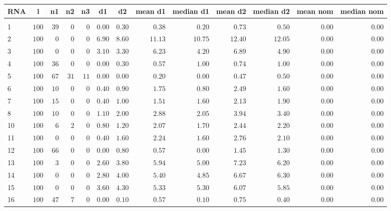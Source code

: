 \documentclass{article}
\begin{document}
\begin{landscape}
\begin{longtable}{lrrrrrrrrrrrr}
\hline\hline
\multicolumn{1}{c}{RNA}&\multicolumn{1}{c}{l}&\multicolumn{1}{c}{n1}&\multicolumn{1}{c}{n2}&\multicolumn{1}{c}{n3}&\multicolumn{1}{c}{d1}&\multicolumn{1}{c}{d2}&\multicolumn{1}{c}{mean d1}&\multicolumn{1}{c}{median d1}&\multicolumn{1}{c}{mean d2}&\multicolumn{1}{c}{median d2}&\multicolumn{1}{c}{mean nom}&\multicolumn{1}{c}{median nom}\\
\hline
&&&&&&&&&&&&\\
1&$100$&$39$&$ 0$&$ 0$&$0.00$&$0.30$&$ 0.38$&$ 0.20$&$ 0.73$&$ 0.50$&$0.00$&$0.00$\\
2&$100$&$ 0$&$ 0$&$ 0$&$6.90$&$8.60$&$11.13$&$10.75$&$12.40$&$12.05$&$0.00$&$0.00$\\
3&$100$&$ 0$&$ 0$&$ 0$&$3.10$&$3.30$&$ 6.23$&$ 4.20$&$ 6.89$&$ 4.90$&$0.00$&$0.00$\\
4&$100$&$36$&$ 0$&$ 0$&$0.00$&$0.30$&$ 0.57$&$ 1.00$&$ 0.74$&$ 1.00$&$0.00$&$0.00$\\
5&$100$&$67$&$31$&$11$&$0.00$&$0.00$&$ 0.20$&$ 0.00$&$ 0.47$&$ 0.50$&$0.00$&$0.00$\\
6&$100$&$10$&$ 0$&$ 0$&$0.40$&$0.90$&$ 1.75$&$ 0.80$&$ 2.49$&$ 1.60$&$0.00$&$0.00$\\
7&$100$&$15$&$ 0$&$ 0$&$0.40$&$1.00$&$ 1.51$&$ 1.60$&$ 2.13$&$ 1.90$&$0.00$&$0.00$\\
8&$100$&$10$&$ 0$&$ 0$&$1.10$&$2.00$&$ 2.88$&$ 2.05$&$ 3.94$&$ 3.40$&$0.00$&$0.00$\\
10&$100$&$ 6$&$ 2$&$ 0$&$0.80$&$1.20$&$ 2.07$&$ 1.70$&$ 2.44$&$ 2.20$&$0.00$&$0.00$\\
11&$100$&$ 0$&$ 0$&$ 0$&$0.40$&$1.60$&$ 2.24$&$ 1.60$&$ 2.76$&$ 2.10$&$0.00$&$0.00$\\
12&$100$&$66$&$ 0$&$ 0$&$0.00$&$0.80$&$ 0.57$&$ 0.00$&$ 1.45$&$ 1.30$&$0.00$&$0.00$\\
13&$100$&$ 3$&$ 0$&$ 0$&$2.60$&$3.80$&$ 5.94$&$ 5.00$&$ 7.23$&$ 6.20$&$0.00$&$0.00$\\
14&$100$&$ 0$&$ 0$&$ 0$&$2.80$&$4.00$&$ 5.40$&$ 4.85$&$ 6.67$&$ 6.30$&$0.00$&$0.00$\\
15&$100$&$ 0$&$ 0$&$ 0$&$3.60$&$4.30$&$ 5.33$&$ 5.30$&$ 6.07$&$ 5.85$&$0.00$&$0.00$\\
16&$100$&$47$&$ 7$&$ 0$&$0.00$&$0.10$&$ 0.57$&$ 0.10$&$ 0.75$&$ 0.40$&$0.00$&$0.00$\\

\end{longtable}
\end{landscape}
\end{document}
